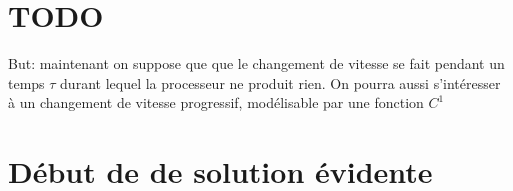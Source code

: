 \documentclass[10pt,a4paper]{article}
\begin{document}
\section{TODO}
But: maintenant on suppose que que le changement de vitesse se fait
pendant un temps $\tau$ durant lequel la processeur ne produit
rien. On pourra aussi s'intéresser à un changement de vitesse
progressif, modélisable par une fonction $C^1$

\section{Début de de solution évidente}
\end{document}

